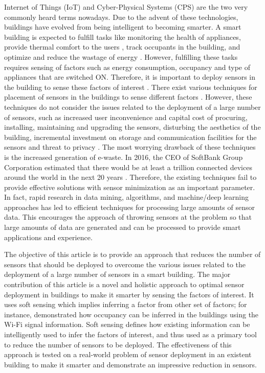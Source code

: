 \documentclass[]{interact}
\theoremstyle{plain}%
\theoremstyle{definition}
\theoremstyle{remark}
\begin{document}
Internet of Things (IoT) and Cyber-Physical Systems (CPS) are the two very commonly heard terms nowadays. Due to the advent of these technologies, buildings have evolved from being intelligent to becoming smarter. A smart building is expected to fulfill tasks like monitoring the health of appliances, provide thermal comfort to the users \citep{elsevier_hvac}, track occupants in the building, and optimize and reduce the wastage of energy \citep{karmakar}. However, fulfilling these tasks requires sensing of factors such as energy consumption, occupancy and type of appliances that are switched ON. Therefore, it is important to deploy sensors in the building to sense these factors of interest \citep{anshul_sensys_demo}. 
There exist various techniques for placement of sensors in the buildings to sense different factors \citep{bellala_electrons, meyn}. However, these techniques do not consider the issues related to the deployment of a large number of sensors, such as increased user inconvenience and capital cost of procuring, installing, maintaining and upgrading the sensors, disturbing the aesthetics of the building, incremental investment on storage and communication facilities for the sensors and threat to privacy \citep{hitchhiker_sensors,stankovic_iot}. The most worrying drawback of these techniques is the increased generation of e-waste. 
In 2016, the CEO of SoftBank Group Corporation estimated that there would be at least a trillion connected devices around the world in the next 20 years \citep{IntofTrash}. Therefore, the existing techniques fail to provide effective solutions with sensor minimization as an important parameter.
In fact, rapid research in data mining, algorithms, and machine/deep learning approaches has led to efficient techniques for processing large amounts of sensor data. This encourages the approach of throwing sensors at the problem so that large amounts of data are generated and can be processed to provide smart applications and experience. 

The objective of this article is to provide an approach that reduces the number of sensors that should be deployed to overcome the various issues related to the deployment of a large number of sensors in a smart building. The major contribution of this article is a novel and holistic approach to optimal sensor deployment in buildings to make it smarter by sensing the factors of interest. It uses soft sensing which implies inferring a factor from other set of factors; 
for instance, \cite{occupancy_wifi} demonstrated how occupancy can be inferred in the buildings using the Wi-Fi signal information. 
Soft sensing  
defines how existing information can be intelligently used to infer the factors of interest, and thus used as a primary tool to  reduce the number of sensors to be deployed. 
The effectiveness of this approach is tested on a real-world problem of sensor deployment in an existent building to make it smarter and demonstrate an impressive reduction in sensors.
\end{document}
